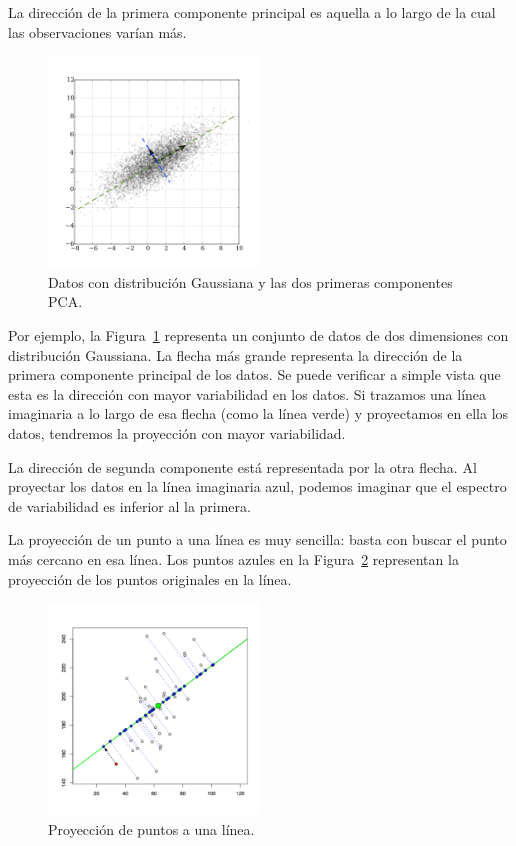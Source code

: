 \documentclass[11pt,spanish,listoffigures,listoftables]{tfgetsinf}
\begin{document}
    La dirección de la primera componente principal es aquella a lo largo de la cual las observaciones varían más.
    
    \begin{figure}[h]
        \centering
        \includegraphics[width=0.5\textwidth]{GaussianScatterPCA.png}
        \caption{Datos con distribución Gaussiana y las dos primeras componentes PCA.}
        \label{fig:pca1}
    \end{figure}    
   
    Por ejemplo, la Figura~\ref{fig:pca1} representa un conjunto de datos de dos dimensiones con distribución Gaussiana. La flecha más grande representa la dirección de la primera componente principal de los datos. Se puede verificar a simple vista que esta es la dirección con mayor variabilidad en los datos. Si trazamos una línea imaginaria a lo largo de esa flecha (como la línea verde) y proyectamos en ella los datos, tendremos la proyección con mayor variabilidad. 
    
    La dirección de segunda componente está representada por la otra flecha. Al proyectar los datos en la línea imaginaria azul, podemos imaginar que el espectro de variabilidad es inferior al la primera.
   
    La proyección de un punto a una línea es muy sencilla: basta con buscar el punto más cercano en esa línea. Los puntos azules en la Figura~\ref{fig:pca_projection} representan la proyección de los puntos originales en la línea.

    \begin{figure}[h]
        \centering
        \includegraphics[width=0.5\textwidth]{ProjectionPCA.jpg}
        \caption{Proyección de puntos a una línea.}
        \label{fig:pca_projection}
    \end{figure}    
    
\end{document}
